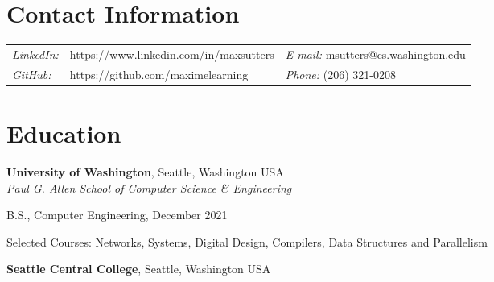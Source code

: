 \documentclass[margin,line]{res}
\newenvironment{list1}{
  \begin{list}{\ding{113}}{%
      \setlength{\itemsep}{0in}
      \setlength{\parsep}{0in} \setlength{\parskip}{0in}
      \setlength{\topsep}{0in} \setlength{\partopsep}{0in} 
      \setlength{\leftmargin}{0.17in}}}{\end{list}}
\begin{document}
\thispagestyle{empty}


\begin{resume}
\section{\sc Contact Information}
\vspace{.05in}
\begin{tabular}{@{}p{0.5in}p{2.5in}p{3in}}
{\it LinkedIn:} & https://www.linkedin.com/in/maxsutters & {\it E-mail:}  msutters@cs.washington.edu \\   
{\it GitHub:} & https://github.com/maximelearning & {\it Phone:} (206) 321-0208 \\
\end{tabular}
%
%
\section{\sc Education}

{\bf University of Washington}, Seattle, Washington USA\\
{\em Paul G. Allen School of Computer Science \& Engineering} \\
\begin{list1}
\item[] B.S., Computer Engineering, December 2021
\item[] Selected Courses: Networks, Systems, Digital Design, Compilers, Data Structures and Parallelism
\end{list1}

{\bf Seattle Central College}, Seattle, Washington USA %
\\


\end{resume}
\end{document}
